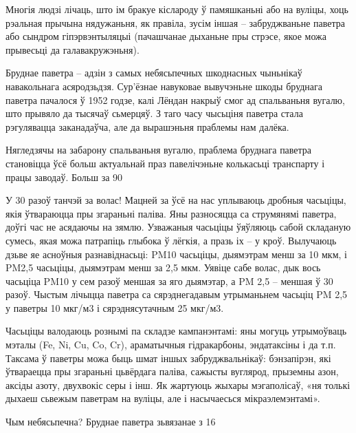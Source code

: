 Многія людзі лічаць, што ім бракуе кіслароду ў памяшканьні або на вуліцы, хоць рэальная прычына нядужаньня, як правіла, зусім іншая – забруджваньне паветра або сындром гіпэрвэнтыляцыі (пачашчанае дыханьне пры стрэсе, якое можа прывесьці да галавакружэньня).

Бруднае паветра – адзін з самых небясьпечных шкоднасных чыньнікаў навакольнага асяродзьдзя. Сур'ёзнае навуковае вывучэньне шкоды бруднага паветра пачалося ў 1952 годзе, калі Лёндан накрыў смог ад спальваньня вугалю, што прывяло да тысячаў сьмерцяў. З таго часу чысьціня паветра стала рэгулявацца заканадаўча, але да вырашэньня праблемы нам далёка.

Нягледзячы на забарону спальваньня вугалю, праблема бруднага паветра становіцца ўсё больш актуальнай праз павелічэньне колькасьці транспарту і працы заводаў. Больш за 90%

У 30 разоў танчэй за волас! Мацней за ўсё на нас уплываюць дробныя часьціцы, якія ўтвараюцца пры згараньні паліва. Яны разносяцца са струмянямі паветра, доўгі час не асядаючы на зямлю. Узважаныя часьціцы ўяўляюць сабой складаную сумесь, якая можа патрапіць глыбока ў лёгкія, а празь іх – у кроў. Вылучаюць дзьве яе асноўныя разнавіднасьці: PM10 часьціцы, дыямэтрам менш за 10 мкм, і PM2,5 часьціцы, дыямэтрам менш за 2,5 мкм. Уявіце сабе волас, дык вось часьціца PM10 у сем разоў меншая за яго дыямэтар, а PM 2,5 – меншая ў 30 разоў. Чыстым лічыцца паветра са сярэднегадавым утрыманьнем часьціц PM 2,5 у паветры 10 мкг/м3 і сярэднясутачным 25 мкг/м3.

Часьціцы валодаюць рознымі па складзе кампанэнтамі: яны могуць утрымоўваць мэталы (Fe, Ni, Cu, Co, Cr), араматычныя гідракарбоны, эндатаксіны і да т.п. Таксама ў паветры можа быць шмат іншых забруджвальнікаў: бэнзапірэн, які ўтвараецца пры згараньні цьвёрдага паліва, сажысты вуглярод, прыземны азон, аксіды азоту, двухвокіс серы і інш. Як жартуюць жыхары мэгаполісаў, «ня толькі дыхаеш сьвежым паветрам на вуліцы, але і насычаесься мікраэлемэнтамі».

Чым небясьпечна? Бруднае паветра зьвязанае з 16%

